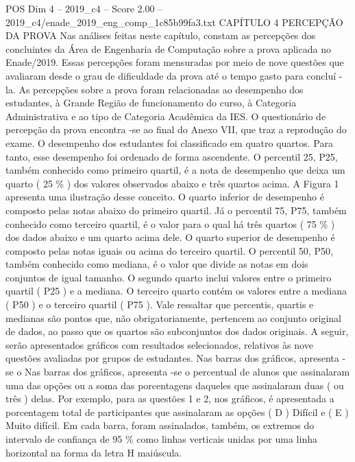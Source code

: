 \begin{textsample}{POS Dim 4 – 2019\_c4 – Score 2.00 – 2019\_c4/enade\_2019\_eng\_comp\_1c85b99fa3.txt}  \label{ex:f4_pos_114}
CAPÍTULO 4 PERCEPÇÃO DA PROVA Nas análises feitas neste capítulo, constam as percepções dos concluintes da Área de Engenharia de Computação sobre a prova aplicada no Enade/2019.
Essas percepções foram mensuradas por meio de nove questões que avaliaram desde o grau de dificuldade da prova até o tempo gasto para concluí -la.
As percepções sobre a prova foram relacionadas ao desempenho dos estudantes, à Grande Região de funcionamento do curso, à Categoria Administrativa e ao tipo de Categoria Acadêmica da IES.
O questionário de percepção da prova encontra -se ao final do Anexo VII, que traz a reprodução do exame.
O desempenho dos estudantes foi classificado em quatro quartos.
Para tanto, esse desempenho foi ordenado de forma ascendente.
O percentil 25, P25, também conhecido como primeiro quartil, é a nota de desempenho que deixa um quarto ( 25 \% ) dos valores observados abaixo e três quartos acima.
A Figura 1 apresenta uma ilustração desse conceito.
O quarto inferior de desempenho é composto pelas notas abaixo do primeiro quartil.
Já o percentil 75, P75, também conhecido como terceiro quartil, é o valor para o qual há três quartos ( 75 \% ) dos dados abaixo e um quarto acima dele.
O quarto superior de desempenho é composto pelas notas iguais ou acima do terceiro quartil.
O percentil 50, P50, também conhecido como mediana, é o valor que divide as notas em dois conjuntos de igual tamanho.
O segundo quarto inclui valores entre o primeiro quartil ( P25 ) e a mediana.
O terceiro quarto contém os valores entre a mediana ( P50 ) e o terceiro quartil ( P75 ).
Vale ressaltar que percentis, quartis e medianas são pontos que, não obrigatoriamente, pertencem ao conjunto original de dados, ao passo que os quartos são subconjuntos dos dados originais.
A seguir, serão apresentados gráficos com resultados selecionados, relativos às nove questões avaliadas por grupos de estudantes.
Nas barras dos gráficos, apresenta -se o Nas barras dos gráficos, apresenta -se o percentual de alunos que assinalaram uma das opções ou a soma das porcentagens daqueles que assinalaram duas ( ou três ) delas.
Por exemplo, para as questões 1 e 2, nos gráficos, é apresentada a porcentagem total de participantes que assinalaram as opções ( D ) Difícil e ( E ) Muito difícil.
Em cada barra, foram assinalados, também, os extremos do intervalo de confiança de 95 \% como linhas verticais unidas por uma linha horizontal na forma da letra H maiúscula.

\end{textsample}
